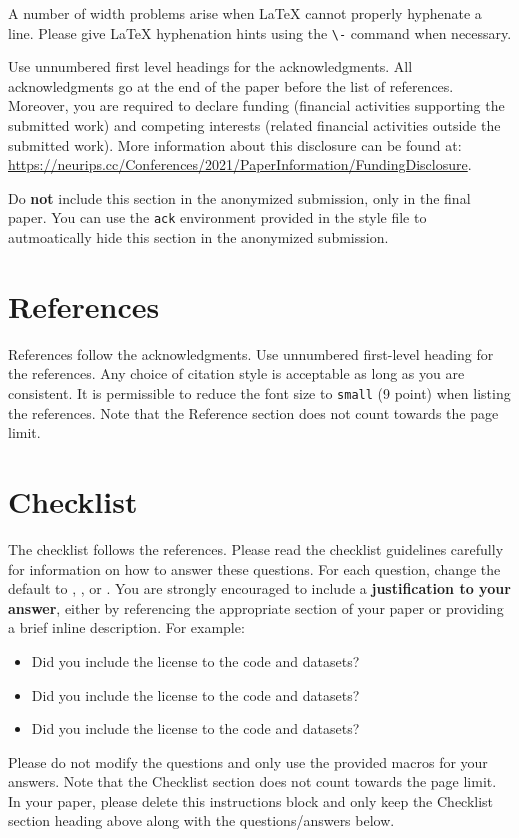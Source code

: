 \documentclass{article}
\begin{document}
A number of width problems arise when \LaTeX{} cannot properly hyphenate a
line. Please give LaTeX hyphenation hints using the \verb+\-+ command when
necessary.

\begin{ack}
Use unnumbered first level headings for the acknowledgments. All acknowledgments
go at the end of the paper before the list of references. Moreover, you are required to declare
funding (financial activities supporting the submitted work) and competing interests (related financial activities outside the submitted work).
More information about this disclosure can be found at: \url{https://neurips.cc/Conferences/2021/PaperInformation/FundingDisclosure}.

Do {\bf not} include this section in the anonymized submission, only in the final paper. You can use the \texttt{ack} environment provided in the style file to autmoatically hide this section in the anonymized submission.
\end{ack}

\section*{References}

References follow the acknowledgments. Use unnumbered first-level heading for
the references. Any choice of citation style is acceptable as long as you are
consistent. It is permissible to reduce the font size to \verb+small+ (9 point)
when listing the references.
Note that the Reference section does not count towards the page limit.
\medskip




\section*{Checklist}

The checklist follows the references.  Please
read the checklist guidelines carefully for information on how to answer these
questions.  For each question, change the default \answerTODO{} to \answerYes{},
\answerNo{}, or \answerNA{}.  You are strongly encouraged to include a {\bf
justification to your answer}, either by referencing the appropriate section of
your paper or providing a brief inline description.  For example:
\begin{itemize}
  \item Did you include the license to the code and datasets? 
  \item Did you include the license to the code and datasets? 
  \item Did you include the license to the code and datasets? \answerNA{}
\end{itemize}
Please do not modify the questions and only use the provided macros for your
answers.  Note that the Checklist section does not count towards the page
limit.  In your paper, please delete this instructions block and only keep the
Checklist section heading above along with the questions/answers below.
\end{document}
